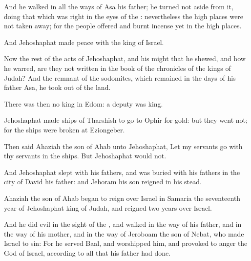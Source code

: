 \verse And he walked in all the ways of Asa his father; he turned not aside from it, doing that which was right in the eyes of the \LORD: nevertheless the high places were not taken away; for the people offered and burnt incense yet in the high places.

\verse And Jehoshaphat made peace with the king of Israel.

\verse Now the rest of the acts of Jehoshaphat, and his might that he shewed, and how he warred, are they not written in the book of the chronicles of the kings of Judah?  \verse And the remnant of the sodomites, which remained in the days of his father Asa, he took out of the land.

\verse There was then no king in Edom: a deputy was king.

\verse Jehoshaphat made ships of Tharshish to go to Ophir for gold: but they went not; for the ships were broken at Eziongeber.

\verse Then said Ahaziah the son of Ahab unto Jehoshaphat, Let my servants go with thy servants in the ships. But Jehoshaphat would not.

\verse And Jehoshaphat slept with his fathers, and was buried with his fathers in the city of David his father: and Jehoram his son reigned in his stead.

\verse Ahaziah the son of Ahab began to reign over Israel in Samaria the seventeenth year of Jehoshaphat king of Judah, and reigned two years over Israel.

\verse And he did evil in the sight of the \LORD, and walked in the way of his father, and in the way of his mother, and in the way of Jeroboam the son of Nebat, who made Israel to sin: \verse For he served Baal, and worshipped him, and provoked to anger the \LORD God of Israel, according to all that his father had done.


